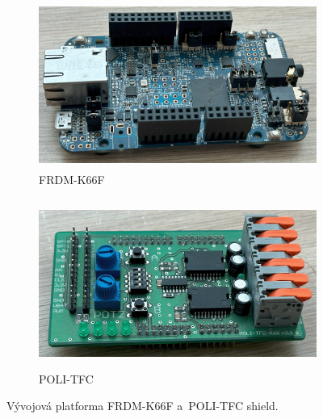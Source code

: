 \begin{figure}[h]
    \begin{subfigure}{0.45\textwidth}
        \includegraphics[width=\textwidth, height = 5.5cm]{Figures/FRDM-K66F.png} 
        \caption{FRDM-K66F}
        \label{fig:FRDM-K66F}
    \end{subfigure}
    \hfill
    \begin{subfigure}{0.45\textwidth}
    	\includegraphics[width=\textwidth, height = 5.5cm]{Figures/POLI-TFC.png}
    	\caption{POLI-TFC}
    	\label{fig:POLI-TFC}
	\end{subfigure}
    \caption{Vývojová platforma FRDM-K66F a~POLI-TFC shield.}
\end{figure}

\endinput